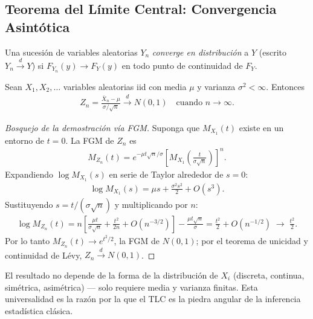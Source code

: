 \subsection{Teorema del Límite Central: Convergencia Asintótica}

\begin{definicion}
Una sucesi\'on de variables aleatorias $Y_n$ \emph{converge en distribuci\'on} a $Y$
(escrito $Y_n \xrightarrow{d} Y$) si $F_{Y_n}(y) \to F_Y(y)$ en todo punto de
continuidad de $F_Y$.
\end{definicion}

\begin{teorema}
 \label{eq:5.2.1}
Sean $X_1, X_2, \ldots$ variables aleatorias iid con media $\mu$ y varianza
$\sigma^2 < \infty$. Entonces
\begin{align}
 Z_n = \frac{\bar{X}_n - \mu}{\sigma/\sqrt{n}} \xrightarrow{d} N(0,1)
 \quad \text{cuando } n \to \infty.
\end{align}
\end{teorema}

\begin{proof}[Bosquejo de la demostraci\'on v\'ia FGM]
Suponga que $M_{X_1}(t)$ existe en un entorno de $t=0$. La FGM de $Z_n$ es
\begin{align}
 M_{Z_n}(t) = e^{-\mu t \sqrt{n}/\sigma}\left[M_{X_1}\!\left(\frac{t}{\sigma\sqrt{n}}\right)\right]^n.
\end{align}
Expandiendo $\log M_{X_1}(s)$ en serie de Taylor alrededor de $s=0$:
\begin{align}
 \log M_{X_1}(s) = \mu s + \frac{\sigma^2 s^2}{2} + O(s^3).
\end{align}
Sustituyendo $s = t/(\sigma\sqrt{n})$ y multiplicando por $n$:
\begin{align}
 \log M_{Z_n}(t) = n\left[\frac{\mu t}{\sigma\sqrt{n}} + \frac{t^2}{2n} + O(n^{-3/2})\right]
 - \frac{\mu t\sqrt{n}}{\sigma} = \frac{t^2}{2} + O(n^{-1/2}) \;\longrightarrow\; \frac{t^2}{2}.
\end{align}
Por lo tanto $M_{Z_n}(t) \to e^{t^2/2}$, la FGM de $N(0,1)$; por el teorema de
unicidad y continuidad de L\'evy, $Z_n \xrightarrow{d} N(0,1)$.
\end{proof}

\begin{observacion}
El resultado no depende de la forma de la distribuci\'on de $X_i$ (discreta,
continua, sim\'etrica, asim\'etrica) --- solo requiere media y varianza finitas.
Esta universalidad es la raz\'on por la que el TLC es la piedra angular de la
inferencia estad\'istica cl\'asica.
\end{observacion}

